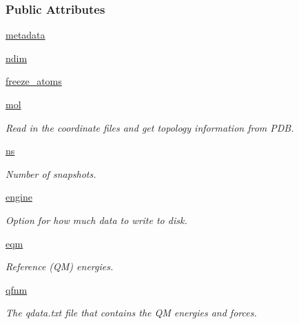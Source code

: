 \subsubsection*{Public Attributes}
\begin{DoxyCompactItemize}
\item 
\hyperlink{classsrc_1_1torsion__profile_1_1TorsionProfileTarget_a0908c012379dcc89a0da203e3c8d668a}{metadata}
\item 
\hyperlink{classsrc_1_1torsion__profile_1_1TorsionProfileTarget_a19b32b5f1f872e29cc9d0c622ea2ca04}{ndim}
\item 
\hyperlink{classsrc_1_1torsion__profile_1_1TorsionProfileTarget_af6b03974a7241385d83e9d022fc32ce7}{freeze\+\_\+atoms}
\item 
\hyperlink{classsrc_1_1torsion__profile_1_1TorsionProfileTarget_a97ae9d4a70c477227c573d780df479fa}{mol}
\begin{DoxyCompactList}\small\item\em Read in the coordinate files and get topology information from P\+DB. \end{DoxyCompactList}\item 
\hyperlink{classsrc_1_1torsion__profile_1_1TorsionProfileTarget_a2fb17f557cfc9406a728bd9a32fbb736}{ns}
\begin{DoxyCompactList}\small\item\em Number of snapshots. \end{DoxyCompactList}\item 
\hyperlink{classsrc_1_1torsion__profile_1_1TorsionProfileTarget_a9d0dc0a03ec67c2902215f7ca7f57264}{engine}
\begin{DoxyCompactList}\small\item\em Option for how much data to write to disk. \end{DoxyCompactList}\item 
\hyperlink{classsrc_1_1torsion__profile_1_1TorsionProfileTarget_a2ddb079e4264001b9e1a38c923694ae2}{eqm}
\begin{DoxyCompactList}\small\item\em Reference (QM) energies. \end{DoxyCompactList}\item 
\hyperlink{classsrc_1_1torsion__profile_1_1TorsionProfileTarget_a9b366b0c78ca940925b15e48f0934eb6}{qfnm}
\begin{DoxyCompactList}\small\item\em The qdata.\+txt file that contains the QM energies and forces. \end{DoxyCompactList}\item 

\end{DoxyCompactItemize}
